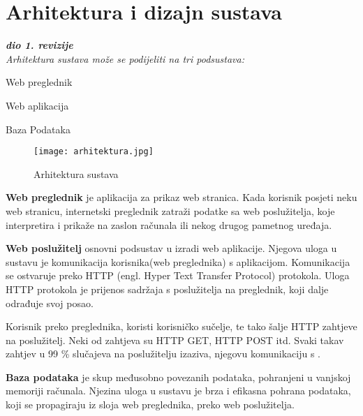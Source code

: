 \chapter{Arhitektura i dizajn sustava}
		
		\textbf{\textit{dio 1. revizije}}\\



               \textit{Arhitektura sustava može se podijeliti  na tri podsustava: }

              \begin{packed_item}
               \item  Web  preglednik
                \item   Web aplikacija
                \item    Baza Podataka

                \end{packed_item}

                 \begin{figure}[H]
                     \texttt{[image: arhitektura.jpg]}
                      \centering
                      \caption{Arhitektura sustava}
                  \end{figure}


                  \textbf{Web preglednik} je aplikacija za prikaz web stranica. Kada korisnik posjeti neku web stranicu, internetski preglednik zatraži podatke
                                 sa web poslužitelja, koje interpretira i prikaže na zaslon računala ili nekog drugog pametnog uređaja.

                  \textbf{Web poslužitelj} osnovni podsustav u izradi web aplikacije. Njegova uloga u sustavu je komunikacija korisnika(web preglednika) s 
                                 aplikacijom. Komunikacija se ostvaruje preko HTTP (engl. Hyper Text Transfer Protocol) protokola. Uloga HTTP protokola je prijenos 
                                 sadržaja s poslužitelja na preglednik, koji dalje odrađuje svoj posao.
                            
                                Korisnik preko preglednika, koristi korisničko sučelje, te tako šalje HTTP zahtjeve na poslužitelj. Neki od zahtjeva su HTTP GET, HTTP POST 
                                itd. Svaki takav zahtjev u 99 \% slučajeva na poslužitelju izaziva, njegovu komunikaciju s .

                  \textbf{Baza podataka} je skup međusobno povezanih podataka, pohranjeni u vanjskoj memoriji računala. Njezina uloga u sustavu je brza i efikasna
                                 pohrana podataka, koji se propagiraju iz sloja web preglednika, preko web poslužitelja.

